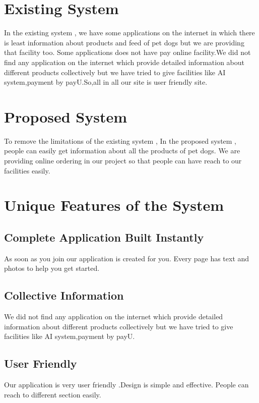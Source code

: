 \section{Existing System}
In the existing system , we have some applications on the internet in which there is least information about products and feed of pet dogs but we are providing that facility too. Some applications does not have pay online facility.We did not find any application on the internet which provide detailed information about different products collectively but we have tried to give facilities like AI system,payment by payU.So,all in all our site is user friendly site.   

\section{Proposed System}
To remove the limitations of the existing system , In the proposed system , people can easily get information about all the products of pet dogs. We are providing online ordering in our project so that people can have reach to our facilities easily.

\section{Unique Features of the System}
\subsection{Complete Application Built Instantly}
As soon as you join our application is created for you. Every page has text and photos to help you get started.  
\subsection{Collective Information}
We did not find any application on the internet which provide detailed information about different products collectively but we have tried to give facilities like AI system,payment by payU. 
\subsection{User Friendly}
Our application is very user friendly .Design is simple and effective. People can reach to different section easily.




